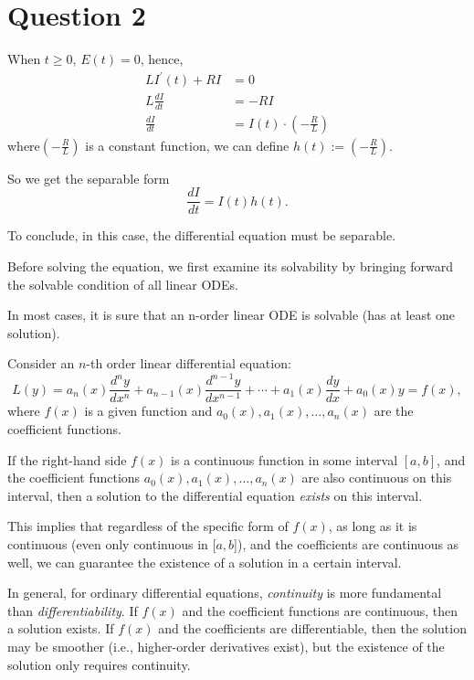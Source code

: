 \documentclass[12pt,a4paper]{article}
\begin{document}
\section*{Question 2}
\begin{solution}
    When $t \geq 0$, $E(t) = 0$, hence,
$$    \begin{aligned}
LI^\prime ( t) +RI & =0\\
L\frac{dI}{dt} & =-RI\\
\frac{dI}{dt} & =I( t) \cdot \left( -\frac{R}{L}\right)
\end{aligned}$$
where$ \left( -\frac{R}{L}\right)$ is a constant function, we can define $h(t) := \left(-\frac{R}{L}\right)$.

So we get the separable form
\begin{equation} \label{W8:sep}
    \frac{dI}{dt} = I(t)h(t).
\end{equation}


To conclude, in this case, the differential equation must be separable.

\begin{remark}
Before solving the equation, we first examine its solvability by bringing forward the solvable condition of all linear ODEs.

In most cases, it is sure that an n-order linear ODE is solvable (has at least one solution).

\begin{theorem}
Consider an \(n\)-th order linear differential equation:
\[
L(y) = a_n(x) \frac{d^n y}{dx^n} + a_{n-1}(x) \frac{d^{n-1} y}{dx^{n-1}} + \cdots + a_1(x) \frac{dy}{dx} + a_0(x) y = f(x),
\]
where \(f(x)\) is a given function and \(a_0(x), a_1(x), \dots, a_n(x)\) are the coefficient functions.

If the right-hand side \(f(x)\) is a continuous function in some interval \([a,b]\), and the coefficient functions \(a_0(x), a_1(x), \dots, a_n(x)\) are also continuous on this interval, then a solution to the differential equation \textit{exists} on this interval.

This implies that regardless of the specific form of \(f(x)\), as long as it is continuous (even only continuous in [$a,b$]), and the coefficients are continuous as well, we can guarantee the existence of a solution in a certain interval.
\end{theorem}
In general, for ordinary differential equations, \textit{continuity} is more fundamental than \textit{differentiability}. If \(f(x)\) and the coefficient functions are continuous, then a solution exists. If \(f(x)\) and the coefficients are differentiable, then the solution may be smoother (i.e., higher-order derivatives exist), but the existence of the solution only requires continuity.


\end{remark}
\end{solution}
\end{document}
